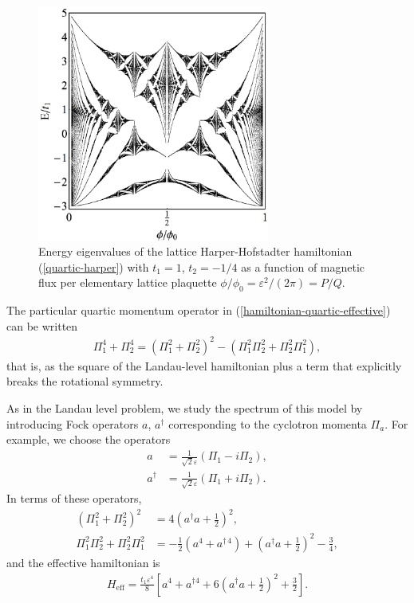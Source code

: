 \documentclass[aps,prb,twocolumn,letterpaper,twoside,nobalancelastpage,groupedaddress,amsmath,amssymb,floatfix,citeautoscript]{revtex4-1}
\begin{document}
\begin{figure}[thb]
\centering
\hspace{-0.25in}\includegraphics[width=3.0in]{q-butterfly-raster-1200.pdf}
\caption{\label{butterfly-plot} Energy eigenvalues of the lattice Harper-Hofstadter hamiltonian (\ref{quartic-harper}) with $t_1 = 1$, $t_2 = -1/4$ as a function of magnetic flux per elementary lattice plaquette $\phi/\phi_0 = \varepsilon^2/(2\pi) = P/Q$.}
\end{figure}

The particular quartic momentum operator in (\ref{hamiltonian-quartic-effective}) can be written
\begin{align*}
\Pi_1^4 + \Pi_2^4 = \left(\Pi_1^2 + \Pi_2^2\right)^2 - \left(\Pi_1^2\Pi_2^2 + \Pi_2^2\Pi_1^2\right),
\end{align*}
that is, as the square of the Landau-level hamiltonian plus a term that explicitly breaks the rotational symmetry.

As in the Landau level problem, we study the spectrum of this model by introducing Fock operators $a$, $a^{\dag}$ corresponding to the cyclotron momenta $\Pi_a$. For example, we choose the operators
\begin{align*}
a &= \frac{1}{\sqrt{2}\varepsilon}\left(\Pi_1 - i\Pi_2\right),\\
a^{\dag} &= \frac{1}{\sqrt{2}\varepsilon}\left(\Pi_1 + i\Pi_2\right).
\end{align*}
In terms of these operators,
\begin{align*}
\left(\Pi_1^2 + \Pi_2^2\right)^2 &= 4\left(a^{\dag}a + \frac{1}{2}\right)^2, \\
\Pi_1^2\Pi_2^2 + \Pi_2^2\Pi_1^2 &= -\frac{1}{2}\left(a^4 + a^{\dag\,4}\right) + \left(a^{\dag}a + \frac{1}{2}\right)^2 - \frac{3}{4},
\end{align*}
and the effective hamiltonian is
\begin{align}
\label{effective-fock-hamiltonian}
H_{\text{eff}} = \frac{t_1\varepsilon^4}{8}\left[a^4 + a^{\dag 4} + 6\left(a^{\dag}a + \frac{1}{2}\right)^2 + \frac{3}{2}\right].
\end{align}
\end{document}
